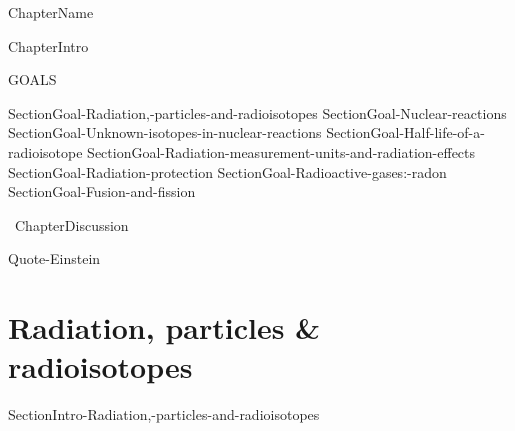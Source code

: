 \documentclass[main.tex]{subfiles}
\newcommand\chapterlabel{Ch-nuclear}\setcounter{figurenewcounter}{0}\setcounter{tablenewcounter}{0}\setcounter{formulanewcounter}{0}
\begin{document}
{ChapterName}\begin{marginfigure}\texttt{[image: ../\{\\chapterlabel]}/figure1} \end{marginfigure}{ChapterIntro}
\begin{marginfigure}%
\begin{mytcbox}{GOALS}
\begin{enumerate}[label=\protect\circled{\color{white}\arabic*}]


{SectionGoal-Radiation,-particles-and-radioisotopes}
{SectionGoal-Nuclear-reactions}
{SectionGoal-Unknown-isotopes-in-nuclear-reactions}
{SectionGoal-Half-life-of-a-radioisotope}
{SectionGoal-Radiation-measurement-units-and-radiation-effects}
{SectionGoal-Radiation-protection}
{SectionGoal-Radioactive-gases:-radon}
{SectionGoal-Fusion-and-fission}

\end{enumerate}
\end{mytcbox}
\vspace{1cm}
\begin{tcolorbox}[enhanced,colback=red!5!white,colframe=black!50!red,boxrule=1pt,
  arc=0pt,outer arc=0pt,drop heavy lifted shadow]
\faGears\ 
{ChapterDiscussion}
\end{tcolorbox}
\end{marginfigure}%

  {Quote-Einstein}





\section{Radiation, particles \& radioisotopes}
{SectionIntro-Radiation,-particles-and-radioisotopes}
\end{document}
